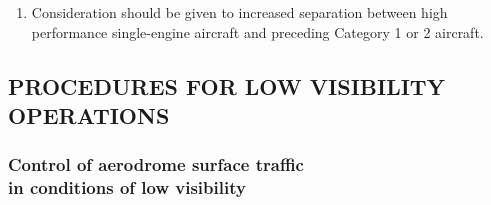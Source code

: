 \documentclass[../main.tex]{subfiles}
\begin{document}
\begin{enumerate}[label=\arabic{section}.\arabic{subsection}.\arabic*]
        \begin{enumerate}[label=\arabic{section}.\arabic{subsection}.\arabic{enumi}.\arabic*]
            \item Consideration should be given to increased separation between high performance single-engine aircraft and preceding Category 1 or 2 aircraft.
        \end{enumerate}
    \end{enumerate}

    \subsection[Procedures for low visibility operations]{PROCEDURES FOR LOW VISIBILITY OPERATIONS}

    \subsubsection[Control of aerodrome surface traffic in conditions of low visibility]{Control of aerodrome surface traffic \\ in conditions of low visibility}

    \begin{enumempty}[labelindent=\parindent]
        \item {}
    \end{enumempty}
\end{document}
